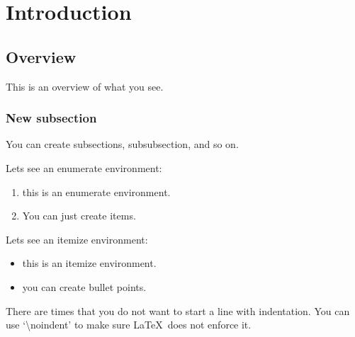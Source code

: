 \chapter{Introduction}\label{chap:Introduction}

\section{Overview}\label{intro:overview}
This is an overview of what you see.

\subsection{New subsection}
You can create subsections, subsubsection, and so on.

Lets see an enumerate environment:
\begin{enumerate}
	\item this is an enumerate environment.
	\item You can just create items.
\end{enumerate}

Lets see an itemize environment:
\begin{itemize}
	\item this is an itemize environment.
	\item you can create bullet points.
\end{itemize}


\noindent There are times that you do not want to start a line with indentation. You can use `\textbackslash noindent' to make sure \LaTeX\ does not enforce it.